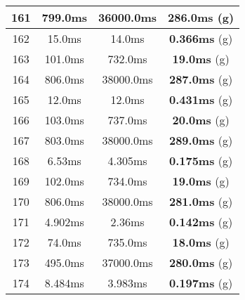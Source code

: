 \begin{table}[H]
\begin{minipage}{5cm}
{\begin{tabular}{|c|c|c|c|}
\hline
161 & 799.0ms & 36000.0ms & \textbf{286.0ms} (g) \\
\hline
162 & 15.0ms & 14.0ms & \textbf{0.366ms} (g) \\
\hline
163 & 101.0ms & 732.0ms & \textbf{19.0ms} (g) \\
\hline
164 & 806.0ms & 38000.0ms & \textbf{287.0ms} (g) \\
\hline
165 & 12.0ms & 12.0ms & \textbf{0.431ms} (g) \\
\hline
166 & 103.0ms & 737.0ms & \textbf{20.0ms} (g) \\
\hline
167 & 803.0ms & 38000.0ms & \textbf{289.0ms} (g) \\
\hline
168 & 6.53ms & 4.305ms & \textbf{0.175ms} (g) \\
\hline
169 & 102.0ms & 734.0ms & \textbf{19.0ms} (g) \\
\hline
170 & 806.0ms & 38000.0ms & \textbf{281.0ms} (g) \\
\hline
171 & 4.902ms & 2.36ms & \textbf{0.142ms} (g) \\
\hline
172 & 74.0ms & 735.0ms & \textbf{18.0ms} (g) \\
\hline
173 & 495.0ms & 37000.0ms & \textbf{280.0ms} (g) \\
\hline
174 & 8.484ms & 3.983ms & \textbf{0.197ms} (g) \\
\hline
\end{tabular}
}
\end{minipage}
\begin{minipage}{5cm} 
\end{minipage}
\end{table}
